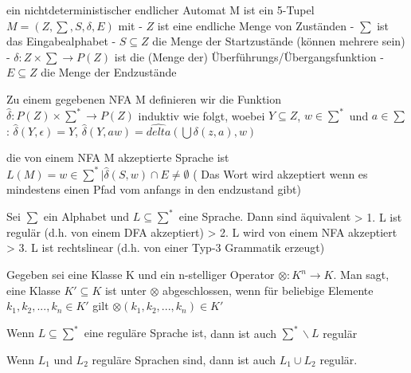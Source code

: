 \documentclass[avery5371]{flashcards}
\begin{document}
\begin{flashcard}[Definition]{ ein nichtdeterministischer endlicher Automat M} ist ein 5-Tupel $M=(Z,\sum,S,\delta,E)$ mit
- $Z$ ist eine endliche Menge von Zuständen
- $\sum$ ist das Eingabealphabet
- $S\subseteq Z$ die Menge der Startzustände (können mehrere sein)
- $\delta: Z \times \sum \rightarrow P(Z)$ ist die (Menge der) Überführungs/Übergangsfunktion
- $E\subseteq Z$ die Menge der Endzustände
\end{flashcard}


\begin{flashcard}[Definition]{ Zu einem gegebenen NFA M definieren wir die Funktion $\hat{\delta}:P(Z)\times \sum^* \rightarrow P(Z)$}
     induktiv wie folgt, woebei $Y \subseteq Z$, $w\in \sum^*$ und $a\in\sum$: $\hat{\delta}(Y,\epsilon)=Y$, $\hat{\delta}(Y,aw)=\hat{delta}(\bigcup \delta(z,a),w)$
    \end{flashcard}

\begin{flashcard}[Definition]{ die von einem NFA M akzeptierte Sprache ist} $L(M)={w\in \sum^* | \hat{\delta}(S,w)\cap E \not = \emptyset}$
( Das Wort wird akzeptiert wenn es mindestens einen Pfad vom anfangs in den endzustand gibt)
\end{flashcard}

\begin{flashcard}[Satz]{ Sei $\sum$ ein Alphabet und $L\subseteq \sum^*$ eine Sprache. Dann sind äquivalent}
> 1. L ist regulär (d.h. von einem DFA akzeptiert)
> 2. L wird von einem NFA akzeptiert
> 3. L ist rechtslinear (d.h. von einer Typ-3 Grammatik erzeugt)
\end{flashcard}

\begin{flashcard}[Definition]{ Gegeben sei eine Klasse K und ein n-stelliger Operator $\otimes : K^n \rightarrow K$.}
    Man sagt, eine Klasse $K'\subseteq K$ ist unter $\otimes$ abgeschlossen, wenn für beliebige Elemente $k_1,k_2,...,k_n\in K'$ gilt $\otimes (k_1,k_2,...,k_n)\in K'$
\end{flashcard}

\begin{flashcard}[Satz]{ Wenn $L\subseteq \sum^*$ eine reguläre Sprache ist,} dann ist auch $\sum^* \backslash L$ regulär
\end{flashcard}

\begin{flashcard}[Satz]{ Wenn $L_1$ und $L_2$ reguläre Sprachen sind,} dann ist auch $L_1 \cup L_2$ regulär.
\end{flashcard}
\end{document}
